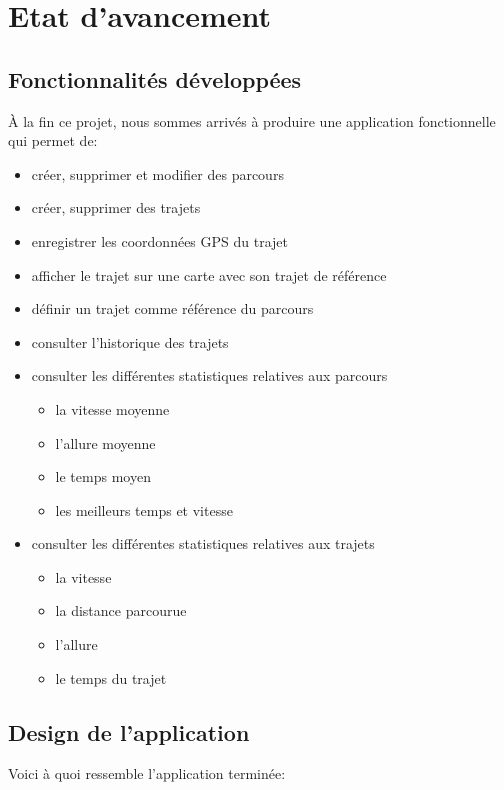 \chapter{Etat d'avancement}
\section{Fonctionnalités développées}
À la fin ce projet, nous sommes arrivés à produire une application fonctionnelle qui permet de:\bigskip

\begin{itemize}
 	\item créer, supprimer et modifier des parcours
 	\item créer, supprimer des trajets
 	\item enregistrer les coordonnées GPS du trajet 
 	\item afficher le trajet sur une carte avec son trajet de référence
 	\item définir un trajet comme référence du parcours
	\item consulter l'historique des trajets 
	\item consulter les différentes statistiques relatives aux parcours 
	\begin{itemize}
		\item la vitesse moyenne
		\item l'allure moyenne
		\item le temps moyen 
		\item les meilleurs temps et vitesse 
	\end{itemize}
 	\item consulter les différentes statistiques relatives aux trajets 
	\begin{itemize}
		\item la vitesse
		\item la distance parcourue
		\item l'allure
		\item le temps du trajet 
	\end{itemize}
\end{itemize}\bigskip

\newpage

\section{Design de l'application}
Voici à quoi ressemble l'application terminée:\bigskip 

